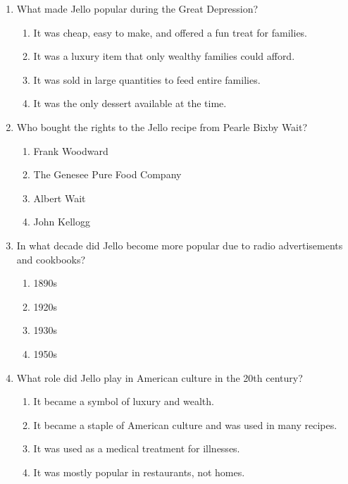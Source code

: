 \documentclass[12pt]{article}
\begin{document}
\begin{enumerate}
\vspace{0.5cm}

\item What made Jello popular during the Great Depression?
\begin{enumerate}[label=\Alph*.]
    \item It was cheap, easy to make, and offered a fun treat for families.
    \item It was a luxury item that only wealthy families could afford.
    \item It was sold in large quantities to feed entire families.
    \item It was the only dessert available at the time.
\end{enumerate}

\vspace{0.5cm}

\item Who bought the rights to the Jello recipe from Pearle Bixby Wait?
\begin{enumerate}[label=\Alph*.]
    \item Frank Woodward
    \item The Genesee Pure Food Company
    \item Albert Wait
    \item John Kellogg
\end{enumerate}

\vspace{0.5cm}

\item In what decade did Jello become more popular due to radio advertisements and cookbooks?
\begin{enumerate}[label=\Alph*.]
    \item 1890s
    \item 1920s
    \item 1930s
    \item 1950s
\end{enumerate}

\vspace{0.5cm}

\item What role did Jello play in American culture in the 20th century?
\begin{enumerate}[label=\Alph*.]
    \item It became a symbol of luxury and wealth.
    \item It became a staple of American culture and was used in many recipes.
    \item It was used as a medical treatment for illnesses.
    \item It was mostly popular in restaurants, not homes.
\end{enumerate}


\end{enumerate}
\end{document}
